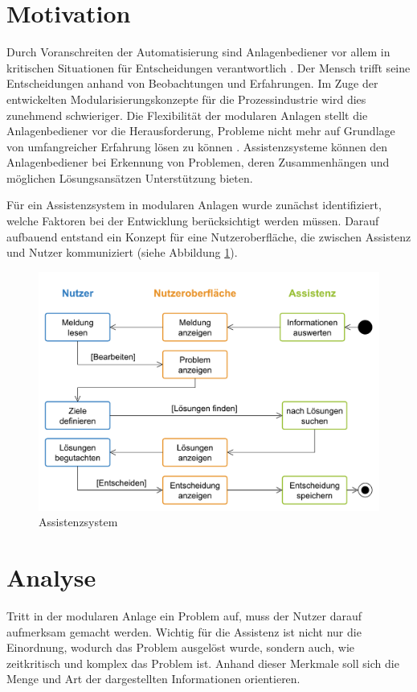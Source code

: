 \documentclass{ifaPoster}
\begin{document}
\section{Motivation}
Durch Voranschreiten der Automatisierung sind Anlagenbediener vor allem in kritischen Situationen für Entscheidungen verantwortlich \cite{bainbridget_ironies_1983}. Der Mensch trifft seine Entscheidungen anhand von Beobachtungen und Erfahrungen. Im Zuge der entwickelten Modularisierungskonzepte für die Prozessindustrie wird dies zunehmend schwieriger. Die Flexibilität der modularen Anlagen stellt die Anlagenbediener vor die Herausforderung, Probleme nicht mehr auf Grundlage von umfangreicher Erfahrung lösen zu können \cite{mueller_2018}. Assistenzsysteme können den Anlagenbediener bei Erkennung von Problemen, deren Zusammenhängen und möglichen Lösungsansätzen Unterstützung bieten. 

Für ein Assistenzsystem in modularen Anlagen wurde zunächst identifiziert, welche Faktoren bei der Entwicklung berücksichtigt werden müssen. Darauf aufbauend entstand ein Konzept für eine Nutzeroberfläche, die zwischen Assistenz und Nutzer kommuniziert (siehe Abbildung \ref{Assistenzsystem}).

\begin{figure}[htbp]
\centering
\includegraphics[scale=0.65]{DA_files/Ablauf-Assistenzsystem.pdf}
\caption{Assistenzsystem}
\label{Assistenzsystem}
\end{figure}

\section{Analyse}
Tritt in der modularen Anlage ein Problem auf, muss der Nutzer darauf aufmerksam gemacht werden. Wichtig für die Assistenz ist nicht nur die Einordnung, wodurch das Problem ausgelöst wurde, sondern auch, wie zeitkritisch und komplex das Problem ist. Anhand dieser Merkmale soll sich die Menge und Art der dargestellten Informationen orientieren.
\end{document}

